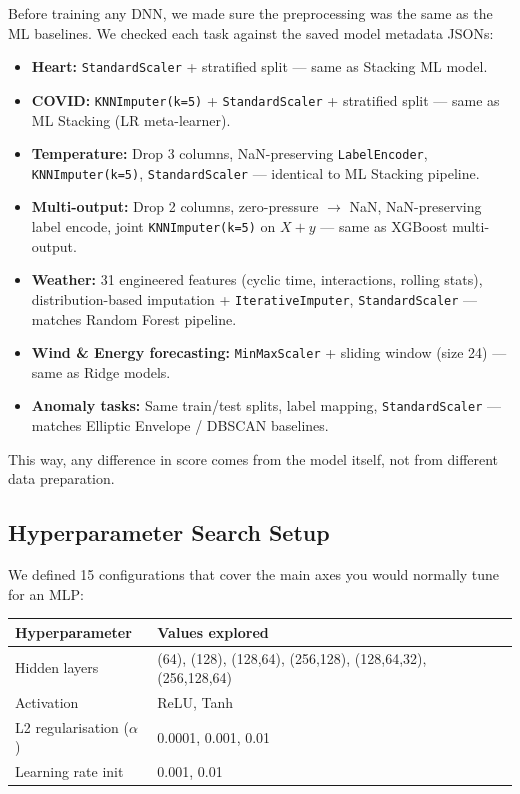 \documentclass[11pt,a4paper]{article}
\begin{document}
Before training any DNN, we made sure the preprocessing was the same as the ML baselines. We checked each task against the saved model metadata JSONs:

\begin{itemize}[leftmargin=1.2em,itemsep=0.15em]
    \item \textbf{Heart:} \texttt{StandardScaler} + stratified split --- same as Stacking ML model.
    \item \textbf{COVID:} \texttt{KNNImputer(k=5)} + \texttt{StandardScaler} + stratified split --- same as ML Stacking (LR meta-learner).
    \item \textbf{Temperature:} Drop 3 columns, NaN-preserving \texttt{LabelEncoder}, \texttt{KNNImputer(k=5)}, \texttt{StandardScaler} --- identical to ML Stacking pipeline.
    \item \textbf{Multi-output:} Drop 2 columns, zero-pressure $\rightarrow$ NaN, NaN-preserving label encode, joint \texttt{KNNImputer(k=5)} on $X+y$ --- same as XGBoost multi-output.
    \item \textbf{Weather:} 31 engineered features (cyclic time, interactions, rolling stats), distribution-based imputation + \texttt{IterativeImputer}, \texttt{StandardScaler} --- matches Random Forest pipeline.
    \item \textbf{Wind \& Energy forecasting:} \texttt{MinMaxScaler} + sliding window (size 24) --- same as Ridge models.
    \item \textbf{Anomaly tasks:} Same train/test splits, label mapping, \texttt{StandardScaler} --- matches Elliptic Envelope / DBSCAN baselines.
\end{itemize}

This way, any difference in score comes from the model itself, not from different data preparation.

\subsection{Hyperparameter Search Setup}

We defined 15 configurations that cover the main axes you would normally tune for an MLP:

\begin{center}
\small
\begin{tabular}{ll}
\toprule
\textbf{Hyperparameter} & \textbf{Values explored} \\
\midrule
Hidden layers & (64), (128), (128,64), (256,128), (128,64,32), (256,128,64) \\
Activation & ReLU, Tanh \\
L2 regularisation ($\alpha$) & 0.0001, 0.001, 0.01 \\
Learning rate init & 0.001, 0.01 \\
\bottomrule
\end{tabular}
\end{center}
\end{document}
